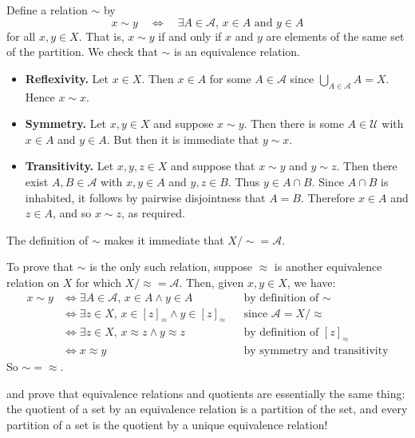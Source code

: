 \begin{cproof}
Define a relation $\sim$ by
\[ x \sim y \quad \Leftrightarrow \quad \exists A \in \mathcal{A},\, x \in A \text{ and } y \in A \]
for all $x,y \in X$. That is, $x \sim y$ if and only if $x$ and $y$ are elements of the same set of the partition. We check that $\sim$ is an equivalence relation.
\begin{itemize}
\item \textbf{Reflexivity.} Let $x \in X$. Then $x \in A$ for some $A \in \mathcal{A}$ since $\bigcup_{A \in \mathcal{A}} A = X$. Hence $x \sim x$.
\item \textbf{Symmetry.} Let $x,y \in X$ and suppose $x \sim y$. Then there is some $A \in \mathcal{U}$ with $x \in A$ and $y \in A$. But then it is immediate that $y \sim x$.
\item \textbf{Transitivity.} Let $x,y,z \in X$ and suppose that $x \sim y$ and $y \sim z$. Then there exist $A,B \in \mathcal{A}$ with $x,y \in A$ and $y,z \in B$. Thus $y \in A \cap B$. Since $A \cap B$ is inhabited, it follows by pairwise disjointness that $A=B$. Therefore $x \in A$ and $z \in A$, and so $x \sim z$, as required.
\end{itemize}
The definition of $\sim$ makes it immediate that $X/{\sim} = \mathcal{A}$.

To prove that $\sim$ is the only such relation, suppose $\approx$ is another equivalence relation on $X$ for which $X/{\approx}=\mathcal{A}$. Then, given $x,y \in X$, we have:
\begin{align*}
x \sim y & \Leftrightarrow \exists A \in \mathcal{A},\, x \in A \wedge y \in A && \text{by definition of $\sim$} \\
& \Leftrightarrow \exists z \in X,\, x \in [z]_{\approx} \wedge y \in [z]_{\approx} && \text{since $\mathcal{A} = X/{\approx}$} \\
& \Leftrightarrow \exists z \in X,\, x \approx z \wedge y \approx z && \text{by definition of $[z]_{\approx}$} \\
& \Leftrightarrow x \approx y && \text{by symmetry and transitivity}
\end{align*}
So ${\sim} = {\approx}$.
\end{cproof}

 and  prove that equivalence relations and quotients are essentially the same thing: the quotient of a set by an equivalence relation is a partition of the set, and every partition of a set is the quotient by a unique equivalence relation!

